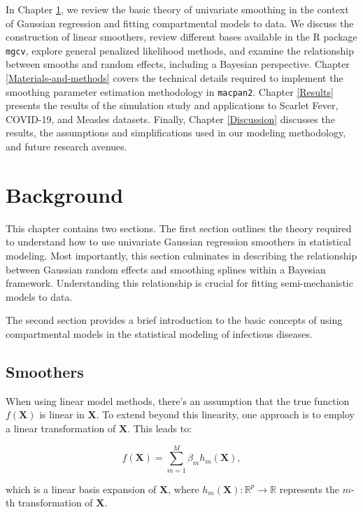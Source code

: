 \documentclass[
11pt, %
oneside, %
english, %
singlespacing, %
]{macthesis} %
\begin{document}
In Chapter \ref{Background}, we review the basic theory of univariate smoothing in the context of Gaussian regression and fitting compartmental models to data. We discuss the construction of linear smoothers, review different bases available in the R package \texttt{mgcv}, explore general penalized likelihood methods, and examine the relationship between smooths and random effects, including a Bayesian perspective. Chapter \ref{Materials-and-methods} covers the technical details required to implement the smoothing parameter estimation methodology in \texttt{macpan2}. Chapter \ref{Results} presents the results of the simulation study and applications to Scarlet Fever, COVID-19, and Measles datasets. Finally, Chapter \ref{Discussion} discusses the results, the assumptions and simplifications used in our modeling methodology, and future research avenues.

\chapter{Background}\label{Background}

This chapter contains two sections. The first section outlines the theory required to understand how to use univariate Gaussian regression smoothers in statistical modeling. Most importantly, this section culminates in describing the relationship between Gaussian random effects and smoothing splines within a Bayesian framework. Understanding this relationship is crucial for fitting semi-mechanistic models to data.

The second section provides a brief introduction to the basic concepts of using compartmental models in the statistical modeling of infectious diseases.

\section{Smoothers}\label{Smoothers}

When using linear model methods, there's an assumption that the true function \(f(\mathbf{X})\) is linear in \(\mathbf{X}\). To extend beyond this linearity, one approach is to employ a linear transformation of \(\mathbf{X}\). This leads to:

\[
f(\mathbf{X}) = \sum_{m=1}^{M}\beta_m h_m(\mathbf{X}),
\]

which is a linear basis expansion of \(\mathbf{X}\),
where \(h_m(\mathbf{X}): \mathbb{R}^{p} \to \mathbb{R}\) represents the \(m\)-th transformation of \(\mathbf{X}\).
\end{document}
